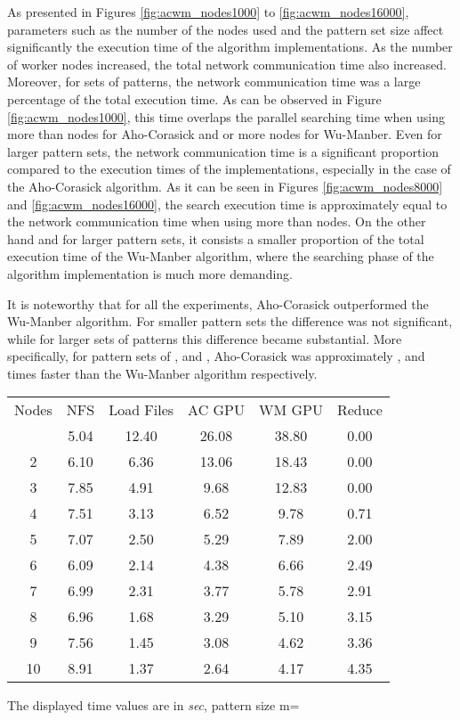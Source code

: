 \documentclass{ws-ijait}
\begin{document}
As presented in Figures \ref{fig:acwm_nodes1000} to \ref{fig:acwm_nodes16000}, parameters such as the number of the nodes used and the pattern set size affect significantly the execution time of the algorithm implementations. As the number of worker nodes increased, the total network communication time also increased. Moreover, for sets of  patterns, the network communication time was a large percentage of the total execution time. As can be observed in Figure \ref{fig:acwm_nodes1000}, this time overlaps the parallel searching time when using more than  nodes for Aho-Corasick and  or more nodes for Wu-Manber. Even for larger pattern sets, the network communication time is a significant proportion compared to the execution times of the implementations, especially in the case of the Aho-Corasick algorithm. As it can be seen in Figures \ref{fig:acwm_nodes8000} and \ref{fig:acwm_nodes16000}, the search execution time is approximately equal to the network communication time when using more than  nodes. On the other hand and for larger pattern sets, it consists a smaller proportion of the total execution time of the Wu-Manber algorithm, where the searching phase of the algorithm implementation is much more demanding.

It is noteworthy that for all the experiments, Aho-Corasick outperformed the Wu-Manber algorithm. For smaller pattern sets the difference was not significant, while for larger sets of patterns this difference became substantial. More specifically, for pattern sets of ,  and , Aho-Corasick was approximately ,  and  times faster than the Wu-Manber algorithm respectively.


\begin{table}[h]
{\begin{tabular}{@{}c |ccccc@{}} \toprule
Nodes & NFS & Load Files & AC GPU & WM GPU & Reduce\\
\colrule
1 & 5.04 & 12.40 & 26.08 & 38.80 & 0.00\\
2 & 6.10 & 6.36 & 13.06 & 18.43 & 0.00\\
3 & 7.85 & 4.91 & 9.68 & 12.83 & 0.00\\
4 & 7.51 & 3.13 & 6.52 & 9.78 & 0.71\\
5 & 7.07 & 2.50 & 5.29 & 7.89 & 2.00\\
6 & 6.09 & 2.14 & 4.38 & 6.66 & 2.49\\
7 & 6.99 & 2.31 & 3.77 & 5.78 & 2.91\\
8 & 6.96 & 1.68 & 3.29 & 5.10 & 3.15\\
9 & 7.56 & 1.45 & 3.08 & 4.62 & 3.36\\
10 & 8.91 & 1.37 & 2.64 & 4.17 & 4.35\\
\hline
\end{tabular}}
\begin{tabnote}
The displayed time values are in \textit{sec}, pattern size m=
\end{tabnote}
\label{tbl:comp-execution-1000}
\end{table}
\end{document}
